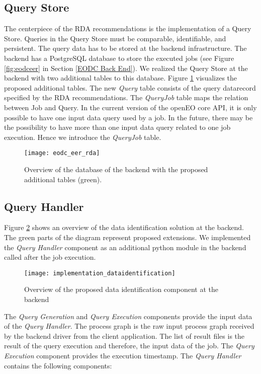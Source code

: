 \documentclass[draft,final]{vutinfth} %
\begin{document}
\subsection{Query Store}
The centerpiece of the RDA recommendations is the implementation of a Query Store. Queries in the Query Store must be comparable, identifiable, and persistent. The query data has to be stored at the backend infrastructure. The backend has a PostgreSQL database to store the executed jobs (see Figure \ref{fig:eodceer} in Section \ref{EODC Back End}). We realized the Query Store at the backend with two additional tables to this database. Figure \ref{fig:eer_rda} visualizes the proposed additional tables. The new \textit{Query} table consists of the query datarecord specified by the RDA recommendations. The \textit{QueryJob} table maps the relation between Job and Query. In the current version of the openEO core API, it is only possible to have one input data query used by a job. In the future, there may be the possibility to have more than one input data query related to one job execution. Hence we introduce the \textit{QueryJob} table. 

\begin{figure}[h]
	\centering
	\texttt{[image: eodc\_eer\_rda]}
	\caption{Overview of the database of the backend with the proposed additional tables (green).}
	\label{fig:eer_rda} %
\end{figure}

\subsection{Query Handler}
Figure \ref{fig:impldataid} shows an overview of the data identification solution at the backend. The green parts of the diagram represent proposed extensions. We implemented the \textit{Query Handler} component as an additional python module in the backend called after the job execution. 

\begin{figure}[h]
	\centering
	\texttt{[image: implementation\_dataidentification]}
	\caption{Overview of the proposed data identification component at the backend}
	\label{fig:impldataid} %
\end{figure}

The \textit{Query Generation} and \textit{Query Execution} components provide the input data of the \textit{Query Handler}. The process graph is the raw input process graph received by the backend driver from the client application. The list of result files is the result of the query execution and therefore, the input data of the job. The \textit{Query Execution} component provides the execution timestamp. The \textit{Query Handler} contains the following components:
\end{document}
